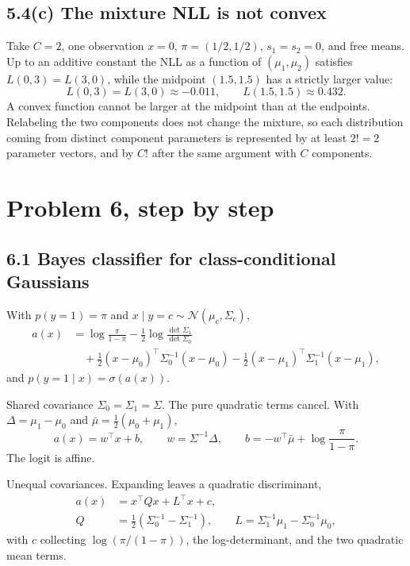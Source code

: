 \documentclass[11pt]{article}
\theoremstyle{remark}
\newcommand{\N}{\mathcal{N}}
\begin{document}
\subsection*{5.4(c) The mixture NLL is not convex}

Take \(C=2\), one observation \(x=0\), \(\pi=(1/2,1/2)\), \(s_1=s_2=0\), and free means. Up to an additive constant the NLL as a function of \((\mu_1,\mu_2)\) satisfies \(L(0,3)=L(3,0)\), while the midpoint \((1.5,1.5)\) has a strictly larger value:
\[
L(0,3)=L(3,0)\approx -0.011,\qquad L(1.5,1.5)\approx 0.432.
\]
A convex function cannot be larger at the midpoint than at the endpoints. Relabeling the two components does not change the mixture, so each distribution coming from distinct component parameters is represented by at least \(2!=2\) parameter vectors, and by \(C!\) after the same argument with \(C\) components.

\newpage
\section{Problem 6, step by step}

\subsection*{6.1 Bayes classifier for class-conditional Gaussians}

With \(p(y=1)=\pi\) and \(x\mid y=c\sim\N(\mu_c,\Sigma_c)\),
\begin{align*}
a(x)&=\log\frac{\pi}{1-\pi}-\tfrac12\log\frac{\det\Sigma_1}{\det\Sigma_0}\\
&\quad+\tfrac12(x-\mu_0)^\top\Sigma_0^{-1}(x-\mu_0)
-\tfrac12(x-\mu_1)^\top\Sigma_1^{-1}(x-\mu_1),
\end{align*}
and \(p(y=1\mid x)=\sigma(a(x))\).

Shared covariance \(\Sigma_0=\Sigma_1=\Sigma\). The pure quadratic terms cancel. With \(\Delta=\mu_1-\mu_0\) and \(\bar\mu=\tfrac12(\mu_0+\mu_1)\),
\[
a(x)=w^\top x+b,\qquad
w=\Sigma^{-1}\Delta,\qquad
b=-w^\top\bar\mu+\log\frac{\pi}{1-\pi}.
\]
The logit is affine.

Unequal covariances. Expanding leaves a quadratic discriminant,
\begin{align*}
a(x)&=x^\top Q x+L^\top x+c,\\
Q&=\tfrac12(\Sigma_0^{-1}-\Sigma_1^{-1}),\qquad
L=\Sigma_1^{-1}\mu_1-\Sigma_0^{-1}\mu_0,
\end{align*}
with \(c\) collecting \(\log(\pi/(1-\pi))\), the log-determinant, and the two quadratic mean terms.
\end{document}

